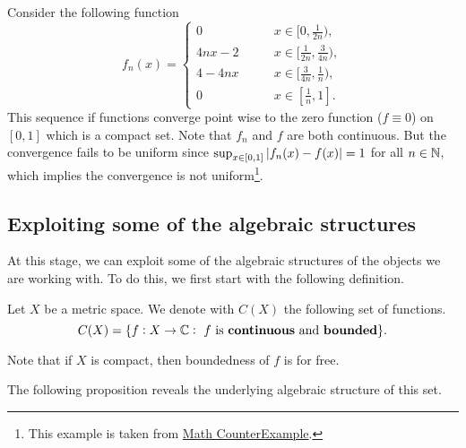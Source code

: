 \begin{example}
	Consider the following function
	\[ 
	f_n(x) = \begin{cases}
		0 \qquad & x\in [0,\frac{1}{2n}),\\
		4nx - 2 \qquad & x\in [\frac{1}{2n},\frac{3}{4n}),\\
		4-4nx \qquad & x\in [\frac{3}{4n},\frac{1}{n}),\\
		0 \qquad & x\in [\frac{1}{n},1].
	\end{cases}
	 \]
	 This sequence if functions converge point wise to the zero function ($ f \equiv 0 $) on $ [0,1] $ which is a compact set. Note that $ f_n $ and $ f $ are both continuous. But the convergence fails to be uniform since $ \sup_{x\in[0,1]}|f_n(x)-f(x)| =1 $ for all $ n\in \mathbb{N} $, which implies the convergence is not uniform\footnote{This example is taken from \href{https://www.mathcounterexamples.net/counterexamples-around-dini-s-theorem/}{Math CounterExample}.}.
\end{example}

\subsection{Exploiting some of the algebraic structures}
At this stage, we can exploit some of the algebraic structures of the objects we are working with. To do this, we first start with the following definition.

\begin{definition}
	Let $ X $ be a metric space. We denote with $ C(X) $ the following set of functions.
	\[ C(X) = \{f: X\to \mathbb{C}:\ f \text{ is \textbf{continuous} and \textbf{bounded}}\}. \]
\end{definition}
\begin{remark}
	Note that if $ X $ is compact, then boundedness of $ f $ is for free.
\end{remark}

The following proposition reveals the underlying algebraic structure of this set. 

